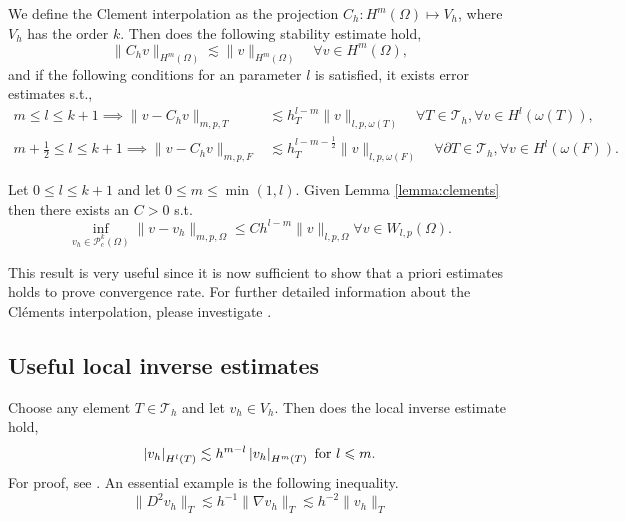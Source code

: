 \begin{lemma}
    \label{lemma:clements}

We define the Clement interpolation as the projection
$C_{h}: H^{m} \left( \Omega  \right) \mapsto V_{h}$, where $V_{h}$ has the order $k$. Then does the following stability estimate hold,
\[
 \| C_{h} v \|_{H^{m}\left( \Omega  \right)   }^{  } \lesssim \| v \|_{ H^{m}\left( \Omega  \right)  }^{  } \quad \forall v \in H^{m}\left( \Omega  \right),
\]
and if the following conditions for an parameter $l$ is satisfied, it exists error estimates s.t.,
\[
    \begin{split}
      m\le l \le k+1  \implies \| v - C_{h} v \|_{ m,p,T   }^{  }  &  \lesssim h^{l-m}_{T} \| v \|_{l,p,\omega \left( T \right)  }^{  } \quad  \forall T \in \mathcal{T} _{h}, \forall v \in H^{l}( \omega \left( T \right)
      ), \\
      m +\frac{1}{2}\le l \le k+1  \implies \| v - C_{h} v \|_{ m,p,F }^{  } & \lesssim h^{l-m- \frac{1}{2}}_{T} \| v \|_{l,p,\omega \left( F \right)  }^{  } \quad  \forall \partial T \in \mathcal{T} _{h}, \forall v \in H^{l}( \omega \left( F
      \right)).
    \end{split}
\]

\end{lemma}


\begin{corollary}
    \label{cor:celement_apriori}
    Let $0 \le l \le k+1$ and let $0\le m \le \min_{} ( 1,l )$.
    Given Lemma \ref{lemma:clements}  then there exists an $C > 0$ s.t.
    \[
    \inf_{v_{h} \in \mathcal{P} ^{k}_{c}( \Omega ) } \| v - v_{h} \|_{  m,p,\Omega }^{  } \le C h^{l-m}  \| v \|_{ l,p,\Omega  }^{  }    \forall v \in W_{l,p}( \Omega ).
    \]
\end{corollary}
This result is very useful since it is now sufficient to show that a priori estimates holds to prove convergence rate. For further detailed information about the Cléments interpolation, please investigate \cite[Chapter 1.6]{ern04}.

\subsection{Useful local inverse estimates}%
\label{sub:some_general_inequalities}


Choose any element $T \in \mathcal{T}_{h} $ and let $v_{h} \in V_{h}  $. Then does the local inverse estimate hold,
\begin{equation}
\label{eq:inv1}
\left\lvert  v_{h}  \right\rvert_{H^{l}( T) }  \lesssim h^{m-l} \left\lvert  v_{h}  \right\rvert_{H^{m}( T  ) }
\text{ for } l \leqslant m.
\end{equation}
 For proof, see \cite[Lemma 12.1]{ErnGuermond2021}. An essential example is the following inequality.
 \begin{equation}
\| D^2v_{h} \|_{T  }^{  } \lesssim h^{-1} \| \nabla v_{h}  \|_{ T  }^{  } \lesssim h^{-2} \| v_{h} \|_{T  }^{  }
 \end{equation}

